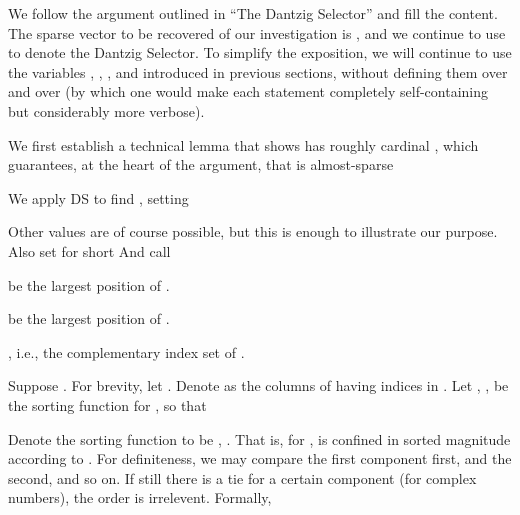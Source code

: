\startchapter [title={Theorems and Proofs}]

We follow the argument outlined in ``The Dantzig Selector'' and fill the content.
The sparse vector to be recovered of our investigation is , and we continue to use  to denote the Dantzig Selector.
To simplify the exposition, we will continue to use the variables , , , and  introduced in previous sections, without defining them over and over (by which one would make each statement completely self-containing but considerably more verbose).

We first establish a technical lemma that shows  has roughly cardinal , which guarantees, at the heart of the argument, that  is almost-sparse 

\startsection [title={Almost-Sparsity of Angular Channel}]

We apply DS to find , setting

Other values are of course possible, but this is enough to illustrate our purpose.
Also set for short
And call
\startitemize [1]
\item {} be the largest  position of .
\item {} be the largest  position of .
\item {}, i.e., the complementary index set of .
\stopitemize

Suppose .
For brevity, let .
Denote as  the columns of  having indices in .
Let , , be the sorting function for , so that

Denote the sorting function to be , .
That is, for ,  is confined in sorted magnitude according to .
For definiteness, we may compare the first component first, and the second, and so on.
If still there is a tie for a certain component (for complex numbers), the order is irrelevent.
Formally,


